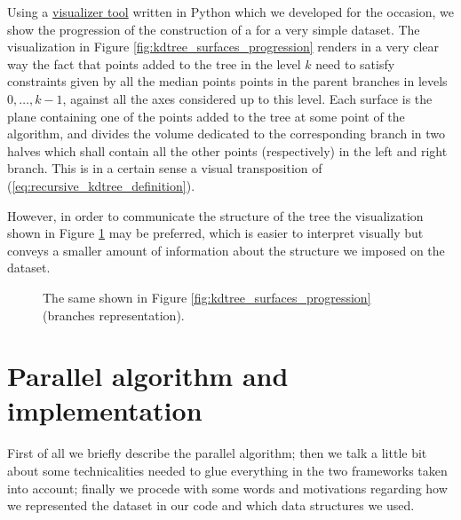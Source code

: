 \documentclass{article}
\begin{document}
Using a
\href{https://github.com/fAndreuzzi/parallel-kd-tree/tree/master/visualization}{visualizer tool}
written in Python which we developed for the occasion, we show the progression
of the construction of a \kdtree{} for a very simple dataset. The visualization
in Figure \ref{fig:kdtree_surfaces_progression} renders in a
very clear way the fact that points added to the tree in the level $k$ need to
satisfy constraints given by all the median points points in the parent branches
in levels $0, \dots, k-1$, against all the axes considered up to this level.
Each surface is the plane containing one of the points
added to the tree at some point of the algorithm, and divides the volume
dedicated to the corresponding branch in two halves which shall contain all the
other points (respectively) in the left and right branch. This is in a certain
sense a visual transposition of (\ref*{eq:recursive_kdtree_definition}).

However, in order to communicate the structure of the tree
the visualization shown in Figure \ref{fig:kdtree_branches_progression} may be
preferred, which is easier to interpret visually but conveys a smaller amount
of information about the structure we imposed on the dataset.

\begin{figure}[t!]
    \caption{The same \kdtree{} shown in Figure \ref{fig:kdtree_surfaces_progression} (branches representation).}
    \label{fig:kdtree_branches_progression}
\end{figure}

\section{Parallel algorithm and implementation} \label{sec:algorithm}
First of all we briefly describe the parallel algorithm; then we talk a little
bit about some technicalities needed to glue everything in the two frameworks
taken into account; finally we procede with some words and motivations regarding
how we represented the dataset in our code and which data structures we used.
\end{document}
